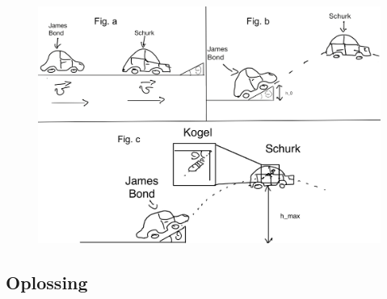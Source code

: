 \documentclass[a4paper,11pt]{article}
\begin{document}
\begin{figure}[H]
    \centering
    \includegraphics[width = \textwidth]{James_Bond.png} 
    \caption{}
    \label{fig:Bond}
\end{figure}

\subsection*{Oplossing}
\end{document}
